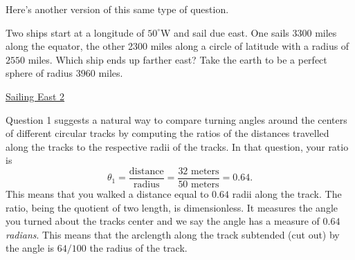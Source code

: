 \documentclass{ximera}
\newcommand{\pskip}{\vskip 0.1 in}
\begin{document}
Here's another version of this same type of question.





\begin{question}  \label{Q2543:Angles}
Two ships start at a longitude of $50^\circ$W and sail due east. One sails 3300 miles along the equator, the other 2300 miles along a circle of latitude with a radius of $2550$ miles. Which ship ends up farther east? Take the earth to be a perfect sphere of radius $3960$ miles.

\begin{onlineOnly}
    \begin{center}
\end{center}
\end{onlineOnly}


\href{https://www.desmos.com/3d/qnygdqj2zg}{Sailing East 2}

\end{question}

Question 1 suggests a natural way to compare turning angles around the centers of different circular tracks by computing the ratios of the distances travelled along the tracks to the respective radii of the tracks. In that question, your ratio is
\[
    \theta_1 = \frac{\text{distance}}{\text{radius}} = \frac{32 \text{ meters}}{50 \text{ meters}} = 0.64.
\]
This means that you walked a distance equal to $0.64$ radii along the track. The ratio, being the quotient of two length, is dimensionless. It measures the angle you turned about the tracks center and we say the angle has a measure of $0.64$ \emph{radians}. This means that the arclength along the track subtended (cut out) by the angle is $64/100$ the radius of the track.  
\end{document}

